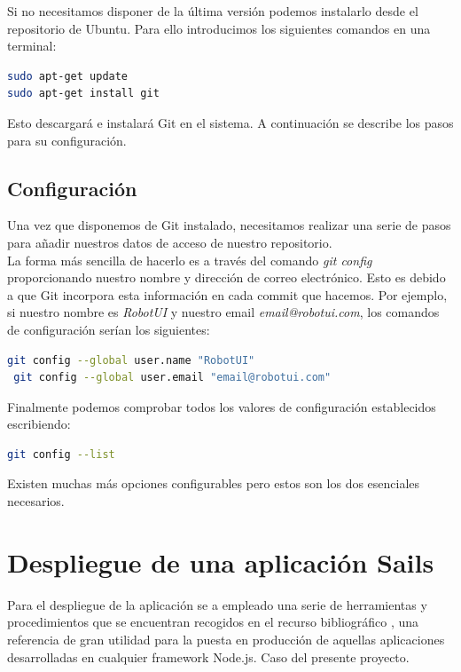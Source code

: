 \begin{appendices}
Si no necesitamos disponer de la última versión podemos instalarlo desde el repositorio de Ubuntu. Para ello introducimos los siguientes comandos en una terminal:\\

\begin{lstlisting}[language=bash]
sudo apt-get update
sudo apt-get install git
\end{lstlisting}

Esto descargará e instalará Git en el sistema. A continuación se describe los pasos para su configuración.

\subsection{Configuración}

Una vez que disponemos de Git instalado, necesitamos realizar una serie de pasos para añadir nuestros datos de acceso de nuestro repositorio.\\

La forma más sencilla de hacerlo es a través del comando \emph{git config} proporcionando nuestro nombre y dirección de correo electrónico. Esto es debido a que Git incorpora esta información en cada commit
que hacemos. Por ejemplo, si nuestro nombre es \emph{RobotUI} y nuestro email \emph{email@robotui.com}, los comandos de configuración serían los siguientes:\\

\begin{lstlisting}[language=bash]
 git config --global user.name "RobotUI"
 git config --global user.email "email@robotui.com"
\end{lstlisting}

Finalmente podemos comprobar todos los valores de configuración establecidos escribiendo:\\

\begin{lstlisting}[language=bash]
git config --list
\end{lstlisting}

Existen muchas más opciones configurables pero estos son los dos esenciales necesarios.\\

\section{Despliegue de una aplicación Sails}

Para el despliegue de la aplicación se a empleado una serie de herramientas y procedimientos que se encuentran recogidos en el recurso bibliográfico \cite{book:Deploying}, una referencia de gran 
utilidad para la puesta en producción de aquellas aplicaciones desarrolladas en cualquier framework Node.js. Caso del presente proyecto.\\


\end{appendices}
